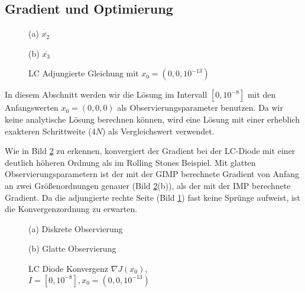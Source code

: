 \subsection{Gradient und Optimierung}
\begin{figure}[H]
\footnotesize
\begin{minipage}[b]{0.49\linewidth}
\centering

\caption*{(a) $\dot{\overline{x_2}}$}
\end{minipage}
\begin{minipage}[b]{0.49\linewidth}
\centering

\caption*{(b) $\dot{\overline{x_3}}$}
\end{minipage}
\caption{LC Adjungierte Gleichung mit $x_0=(0,0,10^{-13})$}
\label{fig:lcAdjointEqRHS}
\end{figure}
In diesem Abschnitt werden wir die Lösung im Intervall $[0,10^{-8}]$ mit den Anfangswerten $x_0=(0,0,0)$ als Observierungsparameter benutzen. Da wir keine analytische Lösung berechnen können, wird eine Lösung mit einer erheblich exakteren Schrittweite ($4N$) als Vergleichswert verwendet.

Wie in Bild \ref{fig:lcAdjointConvergence} zu erkennen, konvergiert der Gradient bei der LC-Diode mit einer deutlich höheren Ordnung als im Rolling Stones Beispiel. Mit glatten Observierungsparametern ist der mit der GIMP berechnete Gradient von Anfang an zwei Größenordnungen genauer (Bild \ref{fig:lcAdjointConvergence}(b)), als der mit der IMP berechnete Gradient. Da die adjungierte rechte Seite (Bild \ref{fig:lcAdjointEqRHS}) fast keine Sprünge aufweist, ist die Konvergenzordnung zu erwarten.
\begin{figure}[H]
\footnotesize 
\centering
\begin{minipage}[b]{0.49\linewidth}

\caption*{(a) Diskrete Observierung}
\end{minipage}
\begin{minipage}[b]{0.49\linewidth}

\caption*{(b) Glatte Observierung}
\end{minipage}
\caption{LC Diode Konvergenz $\nabla J(x_0)$, \\$I=[0,10^{-8}],x_0=(0,0,10^{-13})$}
\label{fig:lcAdjointConvergence}
\end{figure}

